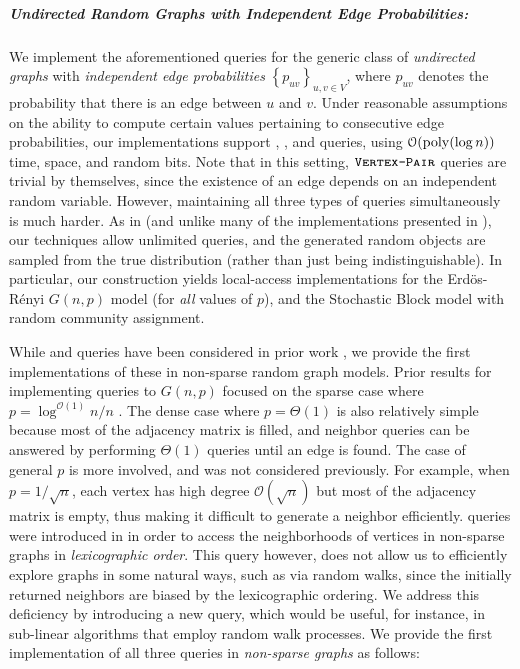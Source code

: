 \subparagraph*{Undirected Random Graphs with Independent Edge Probabilities:}
\label{par:undirected_random_graphs_with_independent_edge_probabilities}
We implement the aforementioned queries for the generic class of \emph{undirected graphs} with \emph{independent edge probabilities}
$\left\{ p_{uv} \right\}_{u,v\in V}$, where $p_{uv}$ denotes the probability that there is an edge between $u$ and $v$.
Under reasonable assumptions on the ability to compute certain values pertaining to consecutive edge probabilities,
our implementations support , , and  queries,
using $\mathcal{O}(\mathrm{poly}(\log n))$ time, space, and random bits.
Note that in this setting, $\texttt{\textsc{Vertex-Pair}}$ queries are trivial by themselves,
since the existence of an edge depends on an independent random variable.
However, maintaining all three types of queries simultaneously is much harder.
As in \cite{reut} (and unlike many of the implementations presented in \cite{huge_old,huge}), our techniques allow unlimited queries,
and the generated random objects are sampled from the true distribution (rather than just being indistinguishable).
In particular, our construction yields local-access implementations for the Erd\"{o}s-R\'{e}nyi $G(n,p)$ model (for \emph{all} values of $p$),
and the Stochastic Block model with random community assignment.


\vspace{-1.5em}

While  and  queries %
have been considered in prior work \cite{reut, huge_old, sparse},
we provide the first implementations of these in non-sparse random graph models.
Prior results for implementing queries to $G(n,p)$ focused on the sparse case where $p = \log^{\mathcal O(1)} n/n$ \cite{sparse}.
The dense case where $p = \Theta(1)$ is also relatively simple because most of the adjacency matrix is filled,
and neighbor queries can be answered by performing $\Theta(1)$  queries until an edge is found.
The case of general $p$ is more involved, and was not considered previously.
For example, when $p = 1/\sqrt{n}$, each vertex has high degree $\mathcal O(\sqrt{n})$ but most of the adjacency matrix is empty,
thus making it difficult to generate a neighbor efficiently.
 queries were introduced in \cite{reut}
in order to access the neighborhoods of vertices in non-sparse graphs in \emph{lexicographic order}.
This query however, does not allow us to efficiently explore graphs in some natural ways, such as via random walks,
since the initially returned neighbors are biased by the lexicographic ordering.
We address this deficiency by introducing a new  query,
which would be useful, for instance, in sub-linear algorithms that employ random walk processes.
We provide the first implementation of all three queries in \emph{non-sparse graphs} as follows:

